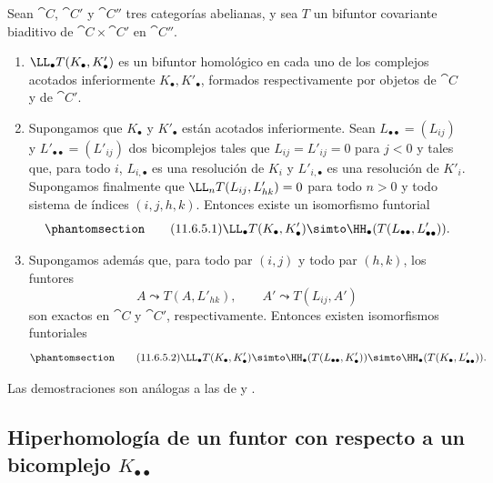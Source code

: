 \documentclass[oneside]{amsart}
\let\EGAOriginalLabel\label
\renewcommand{\label}[1]{\phantomsection\EGAOriginalLabel{#1}}
\begin{document}
\begin{proposition}[11.6.5]
\label{0.11.6.5}
Sean $\cat{C}$, $\cat{C}'$ y $\cat{C}''$ tres categorías abelianas, y sea $T$ un bifuntor covariante biaditivo de $\cat{C}\times\cat{C}'$ en $\cat{C}''$.
\begin{enumerate}
  \item[{\rm(i)}] {$\LL_\bullet T(K_\bullet,K'_\bullet)$ es un bifuntor homológico en cada uno de los complejos acotados inferiormente $K_\bullet,K'_\bullet$, formados respectivamente por objetos de $\cat{C}$ y de $\cat{C}'$.}

  \item[{\rm(ii)}] {Supongamos que $K_\bullet$ y $K'_\bullet$ están acotados inferiormente.
  Sean $L_{\bullet\bullet}=(L_{ij})$ y $L'_{\bullet\bullet}=(L'_{ij})$ dos bicomplejos tales que $L_{ij}=L'_{ij}=0$ para $j<0$ y tales que, para todo $i$, $L_{i,\bullet}$ es una resolución de $K_i$ y $L'_{i,\bullet}$ es una resolución de $K'_i$.
  Supongamos finalmente que $\LL_nT(L_{ij},L'_{hk})=0$ para todo $n>0$ y todo sistema de índices $(i,j,h,k)$.
  Entonces existe un isomorfismo funtorial}
  \[
  \label{0.11.6.5.1}
  \tag{11.6.5.1}
    \LL_\bullet T(K_\bullet,K'_\bullet)
    \simto
    \HH_\bullet(T(L_{\bullet\bullet},L'_{\bullet\bullet})).
  \]

  \item[{\rm(iii)}] {Supongamos además que, para todo par $(i,j)$ y todo par $(h,k)$, los funtores
  \[
    A\leadsto T(A,L'_{hk}),
    \qquad
    A'\leadsto T(L_{ij},A')
  \]
  son exactos en $\cat{C}$ y $\cat{C}'$, respectivamente.
  Entonces existen isomorfismos funtoriales}
  \[
  \label{0.11.6.5.2}
  \tag{11.6.5.2}
    \LL_\bullet T(K_\bullet,K'_\bullet)
    \simto
    \HH_\bullet(T(L_{\bullet\bullet},K'_\bullet))
    \simto
    \HH_\bullet(T(K_\bullet,L'_{\bullet\bullet})).
  \]
\end{enumerate}

\upshape Las demostraciones son análogas a las de  y .
\end{proposition}

\subsection{Hiperhomología de un funtor con respecto a un bicomplejo $K_{\bullet\bullet}$}
\label{subsection:0.11.7}
\end{document}
